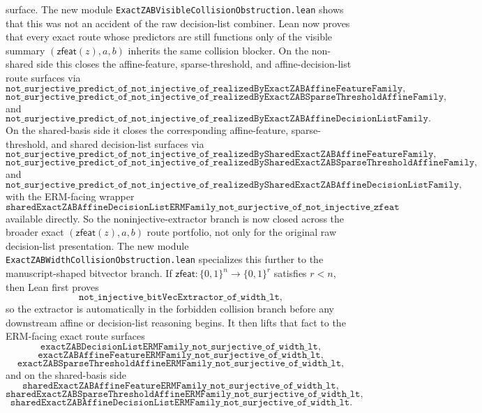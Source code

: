 \documentclass[11pt]{article}
\theoremstyle{remark}
\begin{document}
surface.
The new module \texttt{ExactZABVisibleCollisionObstruction.lean} shows that
this was not an accident of the raw decision-list combiner.  Lean now proves
that every exact route whose predictors are still functions only of the visible
summary \((\mathsf{zfeat}(z),a,b)\) inherits the same collision blocker.  On
the non-shared side this closes the affine-feature, sparse-threshold, and
affine-decision-list route surfaces via
\[
  \texttt{not\_surjective\_predict\_of\_not\_injective\_of\_realizedByExactZABAffineFeatureFamily},
\]
\[
  \texttt{not\_surjective\_predict\_of\_not\_injective\_of\_realizedByExactZABSparseThresholdAffineFamily},
\]
and
\[
  \texttt{not\_surjective\_predict\_of\_not\_injective\_of\_realizedByExactZABAffineDecisionListFamily}.
\]
On the shared-basis side it closes the corresponding affine-feature,
sparse-threshold, and shared decision-list surfaces via
\[
  \texttt{not\_surjective\_predict\_of\_not\_injective\_of\_realizedBySharedExactZABAffineFeatureFamily},
\]
\[
  \texttt{not\_surjective\_predict\_of\_not\_injective\_of\_realizedBySharedExactZABSparseThresholdAffineFamily},
\]
and
\[
  \texttt{not\_surjective\_predict\_of\_not\_injective\_of\_realizedBySharedExactZABAffineDecisionListFamily},
\]
with the ERM-facing wrapper
\[
  \texttt{sharedExactZABAffineDecisionListERMFamily\_not\_surjective\_of\_not\_injective\_zfeat}
\]
available directly.  So the noninjective-extractor branch is now closed across
the broader exact \((\mathsf{zfeat}(z),a,b)\) route portfolio, not only for the
original raw decision-list presentation.
The new module \texttt{ExactZABWidthCollisionObstruction.lean} specializes
this further to the manuscript-shaped bitvector branch.  If
\(\mathsf{zfeat} : \{0,1\}^n \to \{0,1\}^r\) satisfies \(r<n\), then Lean first
proves
\[
  \texttt{not\_injective\_bitVecExtractor\_of\_width\_lt},
\]
so the extractor is automatically in the forbidden collision branch before any
downstream affine or decision-list reasoning begins.  It then lifts that fact
to the ERM-facing exact route surfaces
\[
  \texttt{exactZABDecisionListERMFamily\_not\_surjective\_of\_width\_lt},
\]
\[
  \texttt{exactZABAffineFeatureERMFamily\_not\_surjective\_of\_width\_lt},
\]
\[
  \texttt{exactZABSparseThresholdAffineERMFamily\_not\_surjective\_of\_width\_lt},
\]
and on the shared-basis side
\[
  \texttt{sharedExactZABAffineFeatureERMFamily\_not\_surjective\_of\_width\_lt},
\]
\[
  \texttt{sharedExactZABSparseThresholdAffineERMFamily\_not\_surjective\_of\_width\_lt},
\]
\[
  \texttt{sharedExactZABAffineDecisionListERMFamily\_not\_surjective\_of\_width\_lt}.
\]
\end{document}
